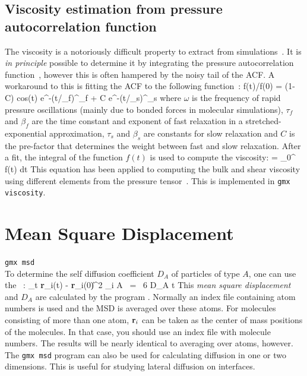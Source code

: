 \subsection{Viscosity estimation from pressure autocorrelation
  function}
The viscosity is a notoriously difficult property to extract from
simulations~\cite{Hess2002a,Wensink2003a}. It is {\em in principle}
possible to determine it by integrating the pressure autocorrelation
function~\cite{PSmith93c}, however this is often hampered by the noisy
tail of the ACF. A workaround to this is fitting the ACF to the
following function~\cite{Guo2002b}:
\beq
f(t)/f(0) = (1-C) {\rm cos}(\omega t) e^{-(t/\tau_f)^{\beta_f}} + C
e^{-(t/\tau_s)^{\beta_s}}
\eeq
where $\omega$ is the frequency of rapid pressure oscillations (mainly
due to bonded forces in molecular simulations), $\tau_f$ and $\beta_f$
are the time constant and exponent of fast relaxation in a
stretched-exponential approximation, $\tau_s$ and $\beta_s$ are constants
for slow relaxation and $C$ is the pre-factor that determines the
weight between fast and slow relaxation. After a fit, the integral of
the function $f(t)$ is used to compute the viscosity:
\beq
\eta = \int_0^{\infty} f(t) dt
\eeq
This equation has been
applied to computing the bulk and shear viscosity using different
elements from the pressure tensor~\cite{Fanourgakis2012a}.
This is implemented in {\tt gmx viscosity}.

\section{Mean Square Displacement}
\label{sec:msd}
{\tt gmx msd}\\
To determine the self diffusion coefficient $D_A$ 
of
particles of type $A$, one can use the ~\cite{Allen87}:
\beq 
\lim_{t \rightarrow \infty} \langle
\|{\bf r}_i(t) - {\bf r}_i(0)\|^2 \rangle_{i \in A} ~=~ 6 D_A t 
\eeq
This {\em mean square displacement} and $D_A$ are calculated by the
program {\tt {}}. Normally an index file containing
atom numbers is used and the MSD is averaged over these atoms.  For
molecules consisting of more than one atom, ${\bf r}_i$ can be taken
as the center of mass positions of the molecules. In that case, you
should use an index file with molecule numbers. The results will be
nearly identical to averaging over atoms, however. The {\tt gmx msd}
program can
also be used for calculating diffusion in one or two dimensions. This
is useful for studying lateral diffusion on interfaces.

